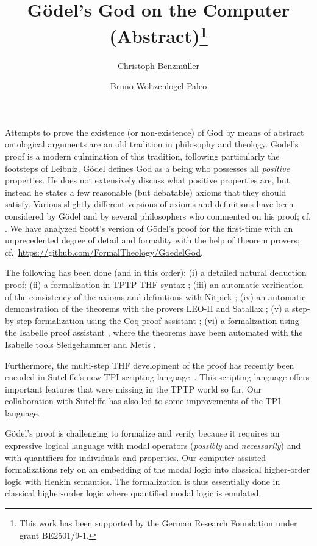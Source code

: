 \documentclass{easychair}
\title{G\"{o}del's God on the Computer (Abstract)\thanks{This work has been
    supported by the German Research Foundation under grant
    BE2501/9-1.}}
\author{
  Christoph Benzm\"{u}ller\inst{1} 
  \and 
  Bruno Woltzenlogel Paleo\inst{2}
}
\institute{
 Freie Universit\"{a}t Berlin, Germany \\
 \email{c.benzmueller@fu-berlin.de} \\
  \and 
 Vienna University of Technology, Austria \\
  \email{bruno@logic.at} \\
}
\begin{document}
\maketitle

Attempts to prove the existence (or non-existence) of God by means of
abstract ontological arguments are an old tradition in philosophy and
theology.  G\"{o}del's proof \cite{Goedel1970,GoedelNotes} is a modern culmination of
this tradition, following particularly the footsteps of Leibniz.
%
G\"{o}del defines God as a being who possesses all \emph{positive} properties.
He does not extensively discuss what positive properties are, 
but instead he states a few reasonable (but debatable) axioms that they should satisfy.
Various slightly different versions of axioms and definitions have
been considered by G\"{o}del and by several philosophers who commented
on his proof; cf. \cite{sobel2004logic,AndersonGettings,Fitting,Adams,ContemporaryBibliography}.
We have analyzed Scott's version of G\"{o}del's proof \cite{ScottNotes} for the first-time
with an unprecedented degree of detail 
and formality with the help of theorem provers; cf.~\url{https://github.com/FormalTheology/GoedelGod}.

The following has been done (and in this order):
(i) a detailed natural deduction proof;
%
(ii) a formalization in TPTP THF syntax \cite{THF};
%
(iii) an automatic verification of the consistency of the axioms and 
definitions with Nitpick \cite{Nitpick};
%
(iv) an automatic demonstration of the theorems with the provers LEO-II \cite{LEO} and Satallax \cite{Satallax};
%
(v) a step-by-step formalization using the Coq proof assistant \cite{Coq};
%
(vi) a formalization using the Isabelle proof assistant \cite{Isabelle}, where the
theorems have been automated with the Isabelle tools Sledgehammer \cite{Sledgehammer} and Metis \cite{Metis}.

Furthermore, the multi-step THF development of the proof has
recently been encoded in Sutcliffe's new TPI scripting
language~\cite{TPI}. This scripting language offers important features
that were missing in the TPTP world so far. Our collaboration with
Sutcliffe has also led to some improvements of the TPI language.

G\"{o}del's proof is challenging to formalize and verify because it
requires an expressive logical language with modal operators
(\emph{possibly} and \emph{necessarily}) and with
quantifiers for individuals and properties.  Our computer-assisted formalizations rely on an
embedding of the modal logic into classical higher-order logic with
Henkin semantics. The formalization is thus essentially
done in classical higher-order logic where  quantified modal logic is
emulated.
\end{document}
